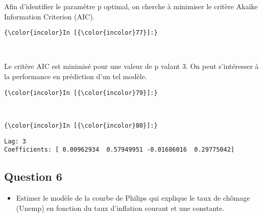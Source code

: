 \documentclass[11pt]{article}
\providecommand{\tightlist}{%
      \setlength{\itemsep}{0pt}\setlength{\parskip}{0pt}}
\begin{document}
    Afin d'identifier le paramètre p optimal, on cherche à minimiser le
critère Akaike Information Criterion (AIC).

    \begin{Verbatim}[commandchars=\\\{\}]
{\color{incolor}In [{\color{incolor}77}]:} 
\end{Verbatim}


    \begin{center}
    \end{center}
    { \hspace*{\fill} \\}
    
    Le critère AIC est minimisé pour une valeur de p valant 3. On peut
s'intéresser à la performance en prédiction d'un tel modèle.

    \begin{Verbatim}[commandchars=\\\{\}]
{\color{incolor}In [{\color{incolor}79}]:} 
\end{Verbatim}


    \begin{center}
    \end{center}
    { \hspace*{\fill} \\}
    
    \begin{Verbatim}[commandchars=\\\{\}]
{\color{incolor}In [{\color{incolor}80}]:} 
\end{Verbatim}


    \begin{Verbatim}[commandchars=\\\{\}]
Lag: 3
Coefficients: [ 0.00962934  0.57949951 -0.01686016  0.29775042]

    \end{Verbatim}

    \subsection{Question 6}\label{question-6}

\begin{itemize}
\tightlist
\item
  Estimer le modèle de la courbe de Philips qui explique le taux de
  chômage (Unemp) en fonction du taux d'inflation courant et une
  constante.
\end{itemize}
\end{document}
